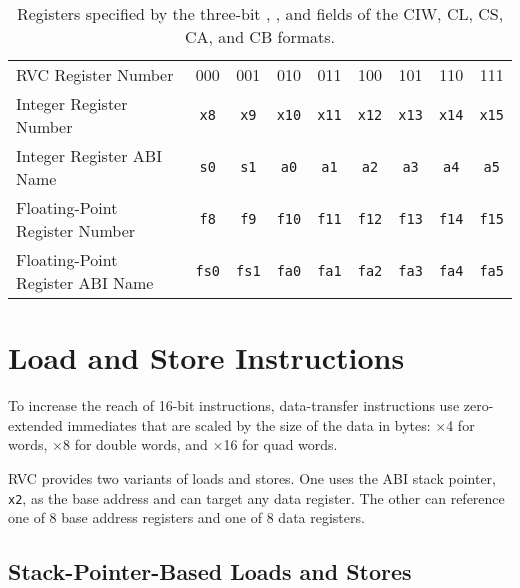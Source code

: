 \begin{table}[H]
{
\begin{center}
\begin{tabular}{l|c|c|c|c|c|c|c|c|}
\cline{2-9}
RVC Register Number  & 000 & 001 & 010 & 011 & 100 & 101 & 110 & 111
\\ \cline{2-9}
Integer Register Number & {\tt x8} & {\tt x9} & {\tt x10} & {\tt x11} & {\tt x12} & {\tt x13} & {\tt x14}  & {\tt x15} \\ \cline{2-9}
Integer Register ABI Name    & {\tt s0}  &  {\tt s1} &  {\tt a0} &  {\tt a1} &  {\tt a2} &  {\tt a3} & {\tt a4}  & {\tt a5} \\ \cline{2-9}
Floating-Point Register Number & {\tt f8} & {\tt f9} & {\tt f10} & {\tt f11} & {\tt f12} & {\tt f13} & {\tt f14}  & {\tt f15} \\ \cline{2-9}
Floating-Point Register ABI Name    & {\tt fs0}  &  {\tt fs1} &  {\tt fa0} &  {\tt fa1} &  {\tt fa2} &  {\tt fa3} & {\tt fa4}  & {\tt fa5} \\ \cline{2-9}
\end{tabular}
\end{center}
}
\caption{Registers specified by the three-bit {\em \rsoneprime}, {\em \rstwoprime}, and {\em \rdprime} fields of the CIW, CL, CS, CA, and CB formats.}
\label{registers}
\end{table}

\section{Load and Store Instructions}

To increase the reach of 16-bit instructions, data-transfer
instructions use zero-extended immediates that are scaled by the size
of the data in bytes: $\times$4 for words, $\times$8 for double words,
and $\times$16 for quad words.

RVC provides two variants of loads and stores.  One uses the ABI stack
pointer, {\tt x2}, as the base address and can target any data register.  The
other can reference one of 8 base address registers and one of 8 data
registers.

\subsection*{Stack-Pointer-Based Loads and Stores}

